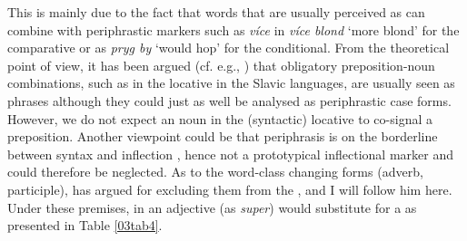 \documentclass[output=paper,colorlinks,citecolor=brown]{langscibook}
\begin{document}
This is mainly due to the fact that words that are usually perceived as  can combine with periphrastic markers such as  \emph{více} in \emph{více blond} `more blond' for the comparative or as  \emph{pryg by} `would hop' for the conditional. From the theoretical point of view, it has been argued (cf. e.g., \citealt{haspelmath2000}) that obligatory preposition-noun combinations, such as in the locative in the Slavic languages, are usually seen as phrases although they could just as well be analysed as periphrastic case forms. However, we do not expect an  noun in the (syntactic) locative to co-signal a preposition. Another viewpoint could be that periphrasis is on the borderline between syntax and inflection \citep{brownchumakinacorbettpopovaspencer2012}, hence not a prototypical inflectional marker and could therefore be neglected. As to the word-class changing forms (adverb, participle), \citet{spencer2020} has argued for excluding them from the , and I will follow him here. Under these premises, in  an  adjective (as \emph{super}) would substitute for a  as presented in Table \ref{03tab4}. 
\end{document}
